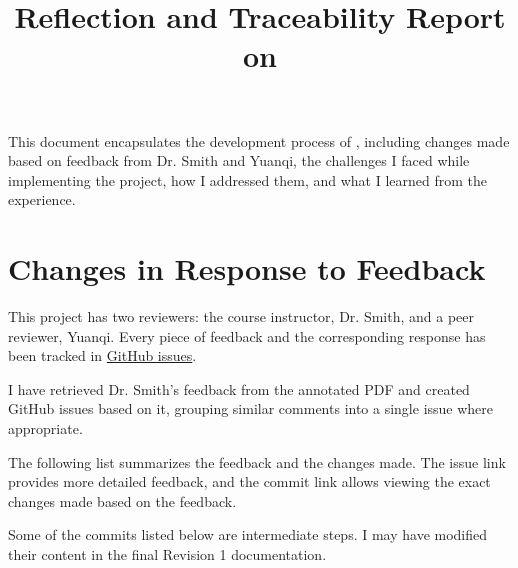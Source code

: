 \documentclass{article}
\title{Reflection and Traceability Report on \progname}
\author{\authname}
\date{}
\begin{document}
\maketitle


This document encapsulates the development process of \progname, including changes made based on feedback from Dr. Smith and Yuanqi, the challenges I faced while implementing the project, how I addressed them, and what I learned from the experience.
\section{Changes in Response to Feedback}

This project has two reviewers: the course instructor, Dr. Smith, and a peer reviewer, Yuanqi. Every piece of feedback and the corresponding response has been tracked in \href{https://github.com/V-AS/Two-tower-recommender-system/issues}{GitHub issues}. 

I have retrieved Dr. Smith's feedback from the annotated PDF and created GitHub issues based on it, grouping similar comments into a single issue where appropriate.

The following list summarizes the feedback and the changes made. The issue link provides more detailed feedback, and the commit link allows viewing the exact changes made based on the feedback.

Some of the commits listed below are intermediate steps. I may have modified their content in the final Revision 1 documentation.
\end{document}

